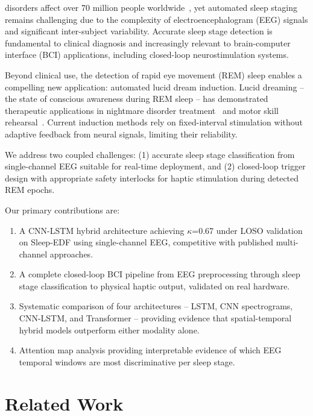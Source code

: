 \documentclass[journal]{IEEEtran}
\begin{document}
 disorders affect over 70 million
people worldwide~\cite{asa2023}, yet automated sleep
staging remains challenging due to the complexity of
electroencephalogram (EEG) signals and significant
inter-subject variability.
Accurate sleep stage detection is fundamental to
clinical diagnosis and increasingly relevant to
brain-computer interface (BCI) applications, including
closed-loop neurostimulation systems.

Beyond clinical use, the detection of rapid eye movement
(REM) sleep enables a compelling new application:
automated lucid dream induction.
Lucid dreaming -- the state of conscious awareness
during REM sleep -- has demonstrated therapeutic
applications in nightmare disorder
treatment~\cite{holzinger2015} and motor skill
rehearsal~\cite{stumbrys2016}.
Current induction methods rely on fixed-interval
stimulation without adaptive feedback from neural
signals, limiting their reliability.

We address two coupled challenges:
(1) accurate sleep stage classification from
single-channel EEG suitable for real-time deployment,
and (2) closed-loop trigger design with appropriate
safety interlocks for haptic stimulation during
detected REM epochs.

Our primary contributions are:
\begin{enumerate}
    \item A CNN-LSTM hybrid architecture achieving
    $\kappa$=0.67 under LOSO validation on Sleep-EDF
    using single-channel EEG, competitive with
    published multi-channel approaches.

    \item A complete closed-loop BCI pipeline from
    EEG preprocessing through sleep stage classification
    to physical haptic output, validated on real hardware.

    \item Systematic comparison of four architectures
    -- LSTM, CNN spectrograms, CNN-LSTM, and Transformer
    -- providing evidence that spatial-temporal hybrid
    models outperform either modality alone.

    \item Attention map analysis providing interpretable
    evidence of which EEG temporal windows are most
    discriminative per sleep stage.
\end{enumerate}

\section{Related Work}
\label{sec:related}
\end{document}
